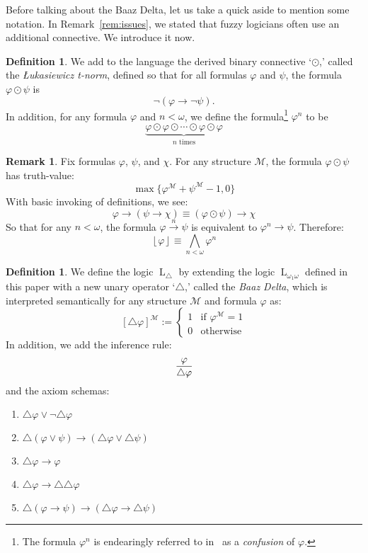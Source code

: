 \documentclass{amsart}
\theoremstyle{definition}
\newtheorem{remark}[theorem]{Remark}
\newtheorem{definition}[theorem]{Definition}
\numberwithin{equation}{theorem}
\renewcommand{\phi}{\varphi}
\newcommand{\strict}[1]{{\left\lfloor#1\right\rfloor}}
\newcommand{\narrow}[1]{\xrightarrow{#1}}
\renewcommand{\to}{\narrow{}}
\newcommand{\baselang}{\operatorname{L}}
\newcommand{\lang}{\baselang_{\omega_1\omega}}
\begin{document}
Before talking about the Baaz Delta, let us take a quick aside to mention some notation.
In Remark~\ref{rem:issues}, we stated that fuzzy logicians often use an additional connective.
We introduce it now.
\begin{definition}
  We add to the language the derived binary connective `$\odot$,' called the \emph{{\L}ukasiewicz t-norm}, defined so that for all formulas $\phi$ and $\psi$, the formula $\phi\odot\psi$ is
  \[
    \neg(\phi\to\neg\psi).
  \]
  In addition, for any formula $\phi$ and $n<\omega$, we define the formula\footnote{The formula $\phi^n$ is endearingly referred to in~\cite{metcalfe2008proof} as a \emph{confusion} of $\phi$.} $\phi^n$ to be
  \[
    \underbrace{\phi\odot\phi\odot\cdots\odot\phi\odot\phi}_\text{$n$ times}
  \]
\end{definition}
\begin{remark}
  Fix formulas $\phi$, $\psi$, and $\chi$.
  For any structure $\mathcal M$, the formula $\phi\odot\psi$ has truth-value:
  \[
    \max\{\phi^\mathcal M+\psi^\mathcal M-1, 0\}
  \]
  With basic invoking of definitions, we see:
  \[
    \phi\to(\psi\to\chi)\equiv (\phi\odot\psi)\to\chi
  \]
  So that for any $n<\omega$, the formula $\phi\narrow{n}\psi$ is equivalent to $\phi^n\to\psi$.
  Therefore:
  \[
    \strict{\phi}\equiv \bigwedge_{n<\omega}\phi^n
  \]
\end{remark}
\begin{definition}\label{def:baaz}
  We define the logic $\baselang_\triangle$ by extending the logic $\lang$ defined in this paper with a new unary operator `$\triangle$,' called the \emph{Baaz Delta}, which is interpreted semantically for any structure $\mathcal M$ and formula $\phi$ as:
  \[
    [\triangle\phi]^\mathcal M:=\left\{\begin{array}{ll} 
      1&\text{if $\phi^\mathcal M=1$}\\
      0&\text{otherwise}
    \end{array}\right.
  \]
  In addition, we add the inference rule:
  \[
    \infer{\triangle\phi}{\phi}
  \]
  and the axiom schemas:
  \begin{enumerate}[label=(A$\triangle$\arabic*)]
  \item\label{itm:axiom-loe-baaz} $\triangle\phi\vee\neg\triangle\phi$
  \item\label{itm:axiom-vee-baaz} $\triangle(\phi\vee\psi)\to(\triangle\phi\vee\triangle\psi)$
  \item\label{itm:axiom-strict-baaz} $\triangle\phi\to\phi$
  \item\label{itm:axiom-double-strict-baaz} $\triangle\phi\to\triangle\triangle\phi$
  \item\label{itm:axiom-impl-baaz} $\triangle(\phi\to\psi)\to(\triangle\phi\to\triangle\psi)$
  \end{enumerate}
\end{definition}
\end{document}
